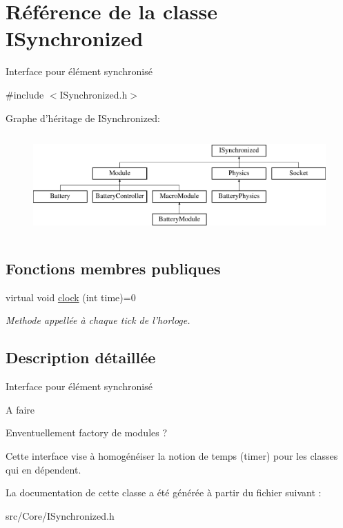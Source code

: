\hypertarget{classISynchronized}{\section{Référence de la classe I\-Synchronized}
\label{classISynchronized}
}


Interface pour élément synchronisé  




{\ttfamily \#include $<$I\-Synchronized.\-h$>$}

Graphe d'héritage de I\-Synchronized\-:\begin{figure}[H]
\begin{center}
\leavevmode
\includegraphics[height=3.862069cm]{classISynchronized}
\end{center}
\end{figure}
\subsection*{Fonctions membres publiques}
\begin{DoxyCompactItemize}
\item 
\hypertarget{classISynchronized_af7155c662758d6c70f381bb9b11afcd6}{virtual void \hyperlink{classISynchronized_af7155c662758d6c70f381bb9b11afcd6}{clock} (int time)=0}\label{classISynchronized_af7155c662758d6c70f381bb9b11afcd6}

\begin{DoxyCompactList}\small\item\em Methode appellée à chaque tick de l'horloge. \end{DoxyCompactList}\end{DoxyCompactItemize}


\subsection{Description détaillée}
Interface pour élément synchronisé 

\begin{DoxyRefDesc}{A faire}
\item[\hyperlink{todo__todo000004}{A faire}]Enventuellement factory de modules ? \end{DoxyRefDesc}


Cette interface vise à homogénéiser la notion de temps (timer) pour les classes qui en dépendent. 

La documentation de cette classe a été générée à partir du fichier suivant \-:\begin{DoxyCompactItemize}
\item 
src/\-Core/I\-Synchronized.\-h\end{DoxyCompactItemize}
